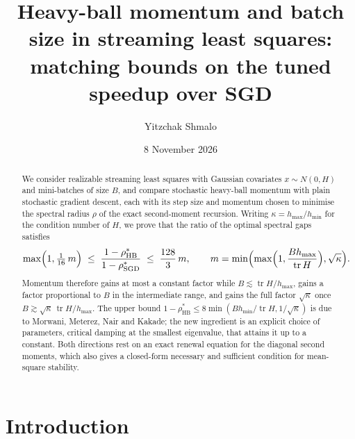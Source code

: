 \documentclass[11pt]{amsart}
\title[Momentum and batch size]{Heavy-ball momentum and batch size in streaming least squares: matching bounds on the tuned speedup over SGD}
\author{Yitzchak Shmalo}
\date{8 November 2026}
\theoremstyle{definition}
\theoremstyle{remark}
\numberwithin{equation}{section}
\newcommand{\tr}{\operatorname{tr}}
\newcommand{\hmax}{h_{\max}}
\newcommand{\hmin}{h_{\min}}
\begin{document}
\begin{abstract}
We consider realizable streaming least squares with Gaussian covariates $x\sim N(0,H)$ and mini-batches of size $B$, and compare stochastic heavy-ball momentum with plain stochastic gradient descent, each with its step size and momentum chosen to minimise the spectral radius $\rho$ of the exact second-moment recursion. Writing $\kappa=\hmax/\hmin$ for the condition number of $H$, we prove that the ratio of the optimal spectral gaps satisfies
\[
\max\Bigl(1,\tfrac1{16}\,m\Bigr)\;\le\;\frac{1-\rho_{\mathrm{HB}}^*}{1-\rho_{\mathrm{SGD}}^*}\;\le\;\frac{128}{3}\,m,
\qquad m=\min\Bigl(\max\Bigl(1,\frac{B\hmax}{\tr H}\Bigr),\sqrt\kappa\Bigr).
\]
Momentum therefore gains at most a constant factor while $B\lesssim\tr H/\hmax$, gains a factor proportional to $B$ in the intermediate range, and gains the full factor $\sqrt\kappa$ once $B\gtrsim\sqrt\kappa\,\tr H/\hmax$. The upper bound $1-\rho_{\mathrm{HB}}^*\le8\min(B\hmin/\tr H,1/\sqrt\kappa)$ is due to Morwani, Meterez, Nair and Kakade; the new ingredient is an explicit choice of parameters, critical damping at the smallest eigenvalue, that attains it up to a constant. Both directions rest on an exact renewal equation for the diagonal second moments, which also gives a closed-form necessary and sufficient condition for mean-square stability.
\end{abstract}
\maketitle

\section{Introduction}\label{sec:intro}
\end{document}
